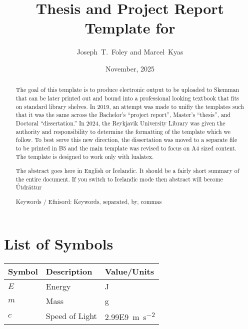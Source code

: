 \documentclass[12pt, a4paper]{memoir}
\title{Thesis and Project Report Template for \theInstitution{}}
\author{Joseph~T.~Foley and Marcel~Kyas}
\date{November, 2025}%
\begin{document}
\maketitle{}
\disableindents{}%
\copyrightpage{}



\tableofcontents{}
\listoffigures{}
\listoftables{}
\chapter{List of Symbols}
\begin{tabular}{lll}\toprule
  Symbol &Description &Value/Units\\\midrule
  $E$ &Energy &\si{\joule}\\
  $m$ &Mass &\si{\gram}\\
  $c$ &Speed of Light &\SI{2.99E9}{\meter\per\square\second}\\\bottomrule
\end{tabular}

\enableindents{}%
\newpage
\begin{abstract}
  The goal of this template is to produce electronic output to be uploaded to Skemman that can be later printed out and bound into a professional looking textbook that fits on standard library shelves.
  In 2019, an attempt was made to unifiy the templates such that it was the same across the Bachelor's ``project report'', Master's ``thesis'', and Doctoral ``dissertation.''
  In 2024, the Reykjavik University Library was given the authority and responsibility to determine the formatting of the template which we follow.
  To best serve this new direction, the dissertation was moved to a separate file to be printed in B5 and the main template was revised to focus on A4 sized content.
  The template is designed to work only with lualatex.
  
  The abstract goes here in English or Icelandic.
  It should be a fairly short summary of the entire document.
  If you switch to Icelandic mode then abstract will become \'{U}tdr\'{a}ttur

  Keywords / Efnisord:  Keywords, separated, by, commas
\end{abstract}
\end{document}

